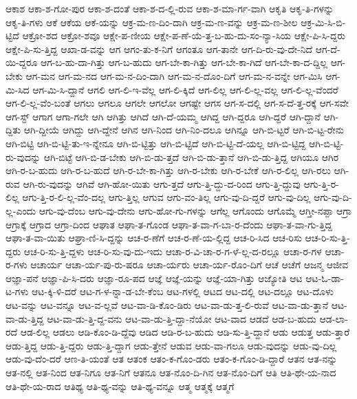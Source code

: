 {ಆಕಾಶ
ಆಕಾ-ಶ-ಗೋ-ಪುರ
ಆಕಾ-ಶ-ದಂತೆ
ಆಕಾ-ಶ-ದ-ಲ್ಲಿ-ರುವ
ಆಕಾ-ಶ-ಮಾ-ರ್ಗ-ವಾಗಿ
ಆಕೃತಿ
ಆಕೃ-ತಿ-ಗಳನ್ನು
ಆಕೃ-ತಿ-ಗಳು
ಆಕೆ
ಆಕೆಯ
ಆಕೆ-ಯನ್ನು
ಆಕ್ರ-ಮ-ಣ-ದಿಂ-ದಾಗಿ
ಆಕ್ರ-ಮ-ಣ-ವನ್ನು
ಆಕ್ರ-ಮ-ಣ-ಶೀಲ
ಆಕ್ರ-ಮಿ-ಸಿ-ಬಿ-ಟ್ಟಿದೆ
ಆಕ್ರೋ-ಶದ
ಆಕ್ರೋ-ಶವೂ
ಆಕ್ಷೇ-ಪ-ಣೀಯ
ಆಕ್ಷೇ-ಪ-ಣೆ-ಯೆ-ತ್ತ-ಬ-ಹು-ದು-ಸಂ-ನ್ಯಾ-ಸಿಯ
ಆಕ್ಷೇ-ಪಿ-ಸಿ-ದ್ದರು
ಆಕ್ಷೇ-ಪಿ-ಸು-ತ್ತಿದ್ದ
ಆಖಾ-ಡ-ವನ್ನು
ಆಗ
ಆಗಂ-ತು-ಕ-ನಿಗೆ
ಆಗಂತೂ
ಆಗ-ತಾನೇ
ಆಗ-ದಿ-ರು-ವು-ದೇ-ನಿದೆ
ಆಗ-ದೆ-ಯಿ-ದ್ದರೂ
ಆಗ-ಬ-ಹು-ದಾ-ಗಿತ್ತು
ಆಗ-ಬ-ಹುದು
ಆಗ-ಬೇ-ಕಾ-ಗಿತ್ತು
ಆಗ-ಬೇ-ಕಾ-ಗಿದೆ
ಆಗ-ಬೇ-ಕಾ-ದ-ದ್ದಿಲ್ಲ
ಆಗ-ಬೇಕು
ಆಗ-ಮನ
ಆಗ-ಮ-ನದ
ಆಗ-ಮ-ನ-ದಿಂ-ದಾಗಿ
ಆಗ-ಮ-ನ-ದೊಂ-ದಿಗೆ
ಆಗ-ಮ-ನ-ವನ್ನೇ
ಆಗ-ಮಿಸಿ
ಆಗ-ಮಿ-ಸಿದ
ಆಗ-ಮಿ-ಸಿ-ದ್ದಾನೆ
ಆಗಲಿ
ಆಗ-ಲಿ-ಇ-ವೆಲ್ಲ
ಆಗ-ಲಿ-ಕ್ಕಿದೆ
ಆಗ-ಲಿಲ್ಲ
ಆಗ-ಲಿ-ಲ್ಲ-ವಲ್ಲ
ಆಗ-ಲಿ-ಲ್ಲ-ವೆಂದರೆ
ಆಗ-ಲಿ-ಲ್ಲ-ವೆಂ-ಬಂತೆ
ಆಗಲು
ಆಗಲೂ
ಆಗಲೇ
ಆಗಲೋ
ಆಗಷ್ಟೇ
ಆಗಸ
ಆಗ-ಸ-ದಲ್ಲಿ
ಆಗ-ಸ-ದೆ-ತ್ತ-ರಕ್ಕೆ
ಆಗ-ಸವೇ
ಆಗ-ಸ್ಟ್
ಆಗಾಗ
ಆಗಾ-ಗಲೇ
ಆಗಿ
ಆಗಿತ್ತು
ಆಗಿದೆ
ಆಗಿ-ದೆ-ಯಮ್ಮ
ಆಗಿದ್ದ
ಆಗಿ-ದ್ದರೂ
ಆಗಿ-ದ್ದರೆ
ಆಗಿ-ದ್ದಾನೆ
ಆಗಿ-ದ್ದಿತು
ಆಗಿ-ದ್ದೀಯೆ
ಆಗಿದ್ದು
ಆಗಿ-ದ್ದೇನೆ
ಆಗಿನ
ಆಗಿ-ನಿಂದ
ಆಗಿ-ನಿಂ-ದಲೂ
ಆಗಿನ್ನೂ
ಆಗಿ-ಬಿ-ಟ್ಟರೆ
ಆಗಿ-ಬಿ-ಟ್ಟ-ರೇನು
ಆಗಿ-ಬಿಟ್ಟಿ
ಆಗಿ-ಬಿ-ಟ್ಟಿ-ತು-ಇ-ನ್ನೇನೂ
ಆಗಿ-ಬಿ-ಟ್ಟಿತ್ತು
ಆಗಿ-ಬಿ-ಟ್ಟಿದೆ
ಆಗಿ-ಬಿ-ಟ್ಟಿ-ದೆ-ಯಲ್ಲ
ಆಗಿ-ಬಿ-ಟ್ಟಿದ್ದ
ಆಗಿ-ಬಿ-ಟ್ಟಿ-ರು-ವುದನ್ನು
ಆಗಿ-ಬಿಟ್ಟೆ
ಆಗಿ-ಬಿ-ಡ-ಬೇಕು
ಆಗಿ-ಬಿ-ಡು-ತ್ತದೆ
ಆಗಿ-ಬಿ-ಡು-ತ್ತಾನೆ
ಆಗಿ-ಬಿ-ಡು-ತ್ತಿದ್ದ
ಆಗಿಯೂ
ಆಗಿರ
ಆಗಿ-ರ-ಬ-ಹುದು
ಆಗಿ-ರ-ಬ-ಹುದೆ
ಆಗಿ-ರ-ಬೇ-ಕಾ-ಗಿತ್ತು
ಆಗಿ-ರ-ಬೇಕು
ಆಗಿ-ರ-ಬೇಕೆ
ಆಗಿ-ರ-ಲಿಲ್ಲ
ಆಗಿ-ರಲು
ಆಗಿ-ರುವ
ಆಗಿ-ರು-ವುದನ್ನು
ಆಗಿವೆ
ಆಗಿ-ಹೋ-ಯಿತು
ಆಗು-ತ್ತದೆ
ಆಗು-ತ್ತಿ-ದ್ದು-ದ-ರಿಂದ
ಆಗು-ತ್ತಿ-ದ್ದುವು
ಆಗು-ತ್ತಿ-ರ-ಲಿಲ್ಲ
ಆಗು-ತ್ತಿ-ರ-ಲಿ-ಲ್ಲ-ವೆಂ-ದಲ್ಲ
ಆಗು-ತ್ತಿಲ್ಲ
ಆಗುವ
ಆಗು-ವಂ-ತಿಲ್ಲ
ಆಗು-ವು-ದಿ-ದ್ದರೆ
ಆಗು-ವು-ದಿಲ್ಲ
ಆಗು-ವು-ದಿ-ಲ್ಲ-ಎಂದು
ಆಗು-ವು-ದೆಂಬ
ಆಗು-ವು-ದೇನು
ಆಗು-ಹೋ-ಗು-ಗಳನ್ನು
ಆಗೆಲ್ಲ
ಆಗೊಂದು
ಆಗೊಮ್ಮೆ
ಆಗ್ತೀ-ನಪ್ಪಾ
ಆಗ್ರಾ
ಆಗ್ರಾಕ್ಕೆ
ಆಗ್ರಾದ
ಆಗ್ರಾ-ದಿಂದ
ಆಘಾತ
ಆಘಾ-ತ-ಗೊಂಡ
ಆಘಾ-ತ-ವಾ-ಗ-ಬಾ-ರ-ದೆಂದು
ಆಘಾ-ತ-ವಾ-ಗು-ತ್ತಿದ್ದ
ಆಘಾ-ತ-ವಾ-ಯಿತು
ಆಘ್ರಾ-ಣಿ-ಸಿ-ದ್ದನ್ನು
ಆಚ-ರ-ಣೆಗೆ
ಆಚ-ರ-ಣೆ-ಯ-ಲ್ಲಿದ್ದ
ಆಚ-ರಿ-ಸಿದ
ಆಚ-ರಿಸು
ಆಚ-ರಿ-ಸು-ತ್ತಿ-ದ್ದರು
ಆಚ-ರಿ-ಸು-ತ್ತಿ-ದ್ದಳು
ಆಚ-ರಿ-ಸು-ವು-ದು-ಇದು
ಆಚಾ-ರ-ವಿ-ಚಾ-ರ-ಗ-ಳೆ-ಲ್ಲ-ದ-ರಲ್ಲೂ
ಆಚಾ-ರ-ಗಳ
ಆಚಾ-ರ-ಗಳು
ಆಚಾರ್ಯ
ಆಚಾ-ರ್ಯ-ಪು-ರು-ಷರೂ
ಆಚಾ-ರ್ಯರು
ಆಚಾ-ರ್ಯ-ರೊಂ-ದಿಗೆ
ಆಚೆ
ಆಚೆಗೆ
ಆಜನ್ಮ
ಆಜೀವ
ಆಜ್ಞಾ-ಪನೆ
ಆಜ್ಞಾ-ಪಿ-ಸಿ-ದರು
ಆಜ್ಞಾ-ರೂ-ಪದ
ಆಜ್ಞೆ
ಆಜ್ಞೆ-ಯನ್ನು
ಆಜ್ಞೆ-ಯಾ-ಗಿತ್ತು
ಆಜ್ಯೋತಿ
ಆಟ
ಆಟ-ಓ-ಡಾ-ಟ-ಗಳು
ಆಟ-ಕ್ಕಿ-ಳಿ-ದರೆ
ಆಟ-ಗ-ಳ-ನ್ನಾ-ಡ-ಬೇ-ಕೆಂಬ
ಆಟ-ಗಳಲ್ಲಿ
ಆಟದ
ಆಟ-ದಲ್ಲಿ
ಆಟ-ದಲ್ಲೂ
ಆಟ-ದೊಳು
ಆಟ-ವನ್ನು
ಆಟ-ವನ್ನೂ
ಆಟ-ವ-ಲ್ಲವೆ
ಆಟ-ವಾ-ಡಿ-ಕೊಂ-ಡಿರು
ಆಟ-ವಾ-ಡು-ತ್ತ-ಲಿ-ರುವೆ
ಆಟ-ವಾ-ಡು-ತ್ತಾನೆ
ಆಟ-ವಾ-ಡು-ತ್ತಿದ್ದ
ಆಟ-ವಾ-ಡು-ತ್ತಿ-ದ್ದ-ವನು
ಆಟ-ವಾ-ಡು-ತ್ತಿ-ದ್ದಾ-ನೆಯೋ
ಆಟ-ವಾದ
ಆಡದೆ
ಆಡ-ಬ-ಹುದು
ಆಡ-ಲಾ-ರದೆ
ಆಡ-ಲಿಲ್ಲ
ಆಡಲು
ಆಡಿ-ಕೊಂ-ಡಿ-ದ್ದೆವು
ಆಡಿದ
ಆಡಿ-ರ-ಬ-ಹುದು
ಆಡಿ-ಸು-ತ್ತಿ-ದ್ದಾನೆ
ಆಡು
ಆಡುತ್ತ
ಆಡು-ತ್ತಾರೆ
ಆಡು-ತ್ತಿದ್ದ
ಆಡು-ತ್ತಿ-ದ್ದರು
ಆಡು-ತ್ತಿ-ದ್ದಾಗ
ಆಡು-ತ್ತೇನೆ
ಆಡುವ
ಆಡು-ವಾ-ಗಲೂ
ಆಡು-ವುದನ್ನು
ಆಡು-ವು-ದಿಲ್ಲ
ಆಡು-ವು-ದೆಂ-ದರೆ
ಆಣ-ತಿ-ಯಂತೆ
ಆತ
ಆತಂಕ
ಆತಂ-ಕ-ಗೊಂ-ಡರು
ಆತಂ-ಕ-ಗೊಂ-ಡಿ-ದ್ದಾರೆ
ಆತನ
ಆತ-ನನ್ನು
ಆತ-ನಲ್ಲಿ
ಆತ-ನಿಂದ
ಆತ-ನಿಗೂ
ಆತ-ನಿಗೆ
ಆತನೂ
ಆತ-ನೊಂ-ದಿ-ಗಿನ
ಆತ-ನೊಂ-ದಿಗೆ
ಆತಿ
ಆತಿ-ಥೇ-ಯ-ನಾದ
ಆತಿ-ಥೇ-ಯ-ರಾದ
ಆತಿಥ್ಯ
ಆತಿ-ಥ್ಯ-ವನ್ನು
ಆತಿ-ಥ್ಯ-ವನ್ನೂ
ಆತ್ಮ
ಆತ್ಮಕ್ಕೆ
ಆತ್ಮಗೆ
}
